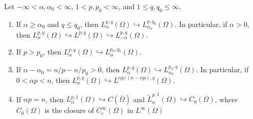 \documentclass[10pt,a4paper]{amsart}
\begin{document}
\begin{lem}\label{properties of SL on domains} Let $-\infty < \alpha, \alpha_0 <\infty$, $1< p, p_0 <\infty$, and $ 1\le q ,q_0 \le \infty$.
\begin{enumerate}[{\upshape (i)}]
\item  If $\alpha  \ge \alpha_0$  and $q \le q_0 $, then   $L_\alpha^{p,q}(\Omega ) \hookrightarrow L_{\alpha_0}^{p,q_0 }(\Omega ) $. In particular, if $\alpha > 0$, then $L_\alpha^{p,q}(\Omega ) \hookrightarrow L^{p,q  }(\Omega )\hookrightarrow L_{-\alpha}^{p,q}(\Omega )$.
\item  If  $p >  p_0$,  then    $L_\alpha^{p,q}(\Omega ) \hookrightarrow L_{\alpha}^{p_0,q_0 }(\Omega ) $.
\item    If $\alpha-\alpha_0 = n/p-n/p_0 >0$, then $L_\alpha^{p,q}(\Omega )\hookrightarrow L_{\alpha_0}^{p_0 , q}(\Omega )$. In particular,  if $0<  \alpha p < n $, then $L_\alpha^{p,q}(\Omega)\hookrightarrow L^{np/(n-\alpha p),q}(\Omega)$.
\item     If $\alpha p=n$, then $L_\alpha^{p,1}(\Omega)\hookrightarrow C  (\overline{\Omega} )$ and $\widetilde{L}_\alpha^{p,1}(\Omega)\hookrightarrow C_0  (\Omega )$, where $C_0 (\Omega )$ is the closure of $C_c^\infty (\Omega )$ in $L^\infty (\Omega)$
\end{enumerate}
\end{lem}
\end{document}
